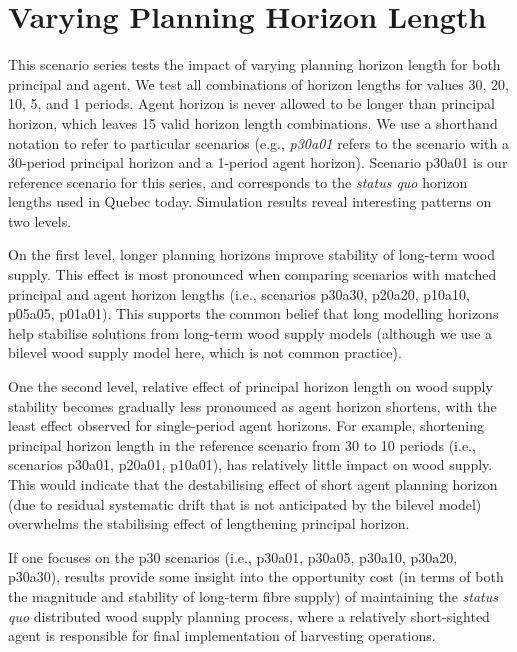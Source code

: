 \section{Varying Planning Horizon Length}
\label{sec:scenario_series_1}

This scenario series tests the impact of varying planning horizon length for both principal and agent. 
We test all combinations of horizon lengths for values 30, 20, 10, 5,  and 1 periods. 
Agent horizon is never allowed to be longer than principal horizon, which leaves 15 valid horizon length combinations.
We use a shorthand notation to refer to particular scenarios (e.g., \emph{p30a01} refers to the scenario with a 30-period principal horizon and a 1-period agent horizon).
Scenario p30a01 is our reference scenario for this series, and corresponds to the \emph{status quo} horizon lengths used in Quebec today.
Simulation results reveal interesting patterns on two levels.


On the first level, longer planning horizons improve stability of long-term wood supply. This effect is most pronounced when comparing scenarios with matched principal and agent horizon lengths (i.e., scenarios p30a30, p20a20, p10a10, p05a05, p01a01). This supports the common belief that long modelling horizons help stabilise solutions from long-term wood supply models (although we use a bilevel wood supply model here, which is not common practice).

One the second level, relative effect of principal horizon length on wood supply stability becomes gradually less pronounced as agent horizon shortens, with the least effect observed for single-period agent horizons. For example, shortening principal horizon length in the reference scenario from 30 to 10 periods (i.e., scenarios p30a01, p20a01, p10a01), has relatively little impact on wood supply. This would indicate that the destabilising effect of short agent planning horizon (due to residual systematic drift that is not anticipated by the bilevel model) overwhelms the stabilising effect of lengthening principal horizon. 

If one focuses on the p30 scenarios (i.e., p30a01, p30a05, p30a10, p30a20, p30a30), results provide some insight into the opportunity cost (in terms of both the magnitude and stability of long-term fibre supply) of maintaining the \emph{status quo} distributed wood supply planning process, where a relatively short-sighted agent is responsible for final implementation of harvesting operations. 

